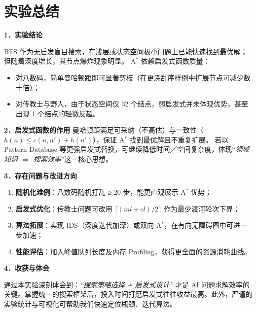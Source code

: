 \documentclass[UTF8]{ctexart}
\begin{document}
\section*{实验总结}

\textbf{1．实验结论}  

BFS 作为无启发盲目搜索，在浅层或状态空间极小问题上已能快速找到最优解；但随着深度增长，其节点爆炸现象明显。  
A$^{*}$ 依赖启发式函数质量：  
\begin{itemize}
  \item 对八数码，简单曼哈顿距即可显著剪枝（在更深乱序样例中扩展节点可减少数十倍）；  
  \item 对传教士与野人，由于状态空间仅 32 个结点，弱启发式并未体现优势，甚至出现 1 个结点的轻微反超。
\end{itemize}

\textbf{2．启发式函数的作用}  
曼哈顿距满足可采纳（不高估）与一致性（$h(n) \leq c(n,n') + h(n')$），保证 A$^{*}$ 找到最优解且不重复扩展。  
若以 Pattern Data\-base 等更强启发式替换，可继续降低时间／空间复杂度，体现“\emph{领域知识 $\Rightarrow$ 搜索效率}”这一核心思想。

\textbf{3．存在问题与改进方向}  
\begin{enumerate}[label=(\alph*)]
  \item \textbf{随机化难例}：八数码随机打乱 ≥ 20 步，能更直观展示 A$^{*}$ 优势；  
  \item \textbf{启发式优化}：传教士问题可改用 $\lceil (ml+cl)/2 \rceil$ 作为最少渡河轮次下界；  
  \item \textbf{算法拓展}：实现 IDS（深度迭代加深）或双向 A$^{*}$，在有向无障碍图中可进一步加速；  
  \item \textbf{性能评估}：加入峰值队列长度及内存 Profiling，获得更全面的资源消耗曲线。
\end{enumerate}

\textbf{4．收获与体会}  

通过本实验深刻体会到：\emph{“搜索策略选择 + 启发式设计”} 才是 AI 问题求解效率的关键。掌握统一的搜索框架后，投入时间打磨启发式往往收益最高。此外，严谨的实验统计与可视化可帮助我们快速定位瓶颈、迭代算法。
\end{document}

